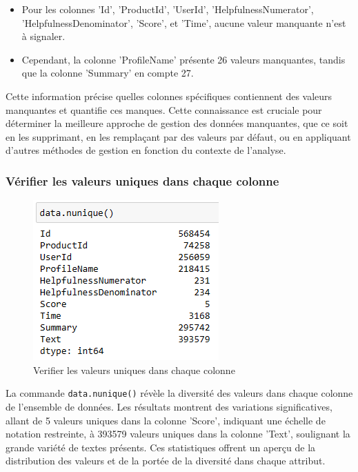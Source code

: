 \begin{itemize}
    \item Pour les colonnes 'Id', 'ProductId', 'UserId', 'HelpfulnessNumerator', 'HelpfulnessDenominator', 'Score', et 'Time', aucune valeur manquante n'est à signaler.
    \item Cependant, la colonne 'ProfileName' présente 26 valeurs manquantes, tandis que la colonne 'Summary' en compte 27.
\end{itemize}

Cette information précise quelles colonnes spécifiques contiennent des valeurs manquantes et quantifie ces manques. Cette connaissance est cruciale pour déterminer la meilleure approche de gestion des données manquantes, que ce soit en les supprimant, en les remplaçant par des valeurs par défaut, ou en appliquant d'autres méthodes de gestion en fonction du contexte de l'analyse.

\newpage 
\subsubsection{Vérifier les valeurs uniques dans chaque colonne}
\begin{figure}[h]
    \centering
    \includegraphics[scale=1]{assets/nunique.PNG}
    \caption{Verifier les valeurs uniques dans chaque colonne}
    \label{fig:isnull}
\end{figure}
La commande \texttt{data.nunique()} révèle la diversité des valeurs dans chaque colonne de l'ensemble de données. Les résultats montrent des variations significatives, allant de 5 valeurs uniques dans la colonne 'Score', indiquant une échelle de notation restreinte, à 393579 valeurs uniques dans la colonne 'Text', soulignant la grande variété de textes présents. Ces statistiques offrent un aperçu de la distribution des valeurs et de la portée de la diversité dans chaque attribut.

